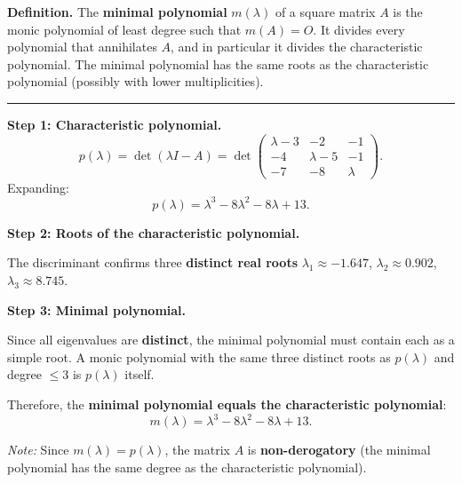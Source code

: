 \documentclass[12pt,a3paper]{article}
\begin{document}
 
\begin{tcolorbox}[enhanced,breakable,
  colback=cE!4,colframe=cE,boxrule=0.8pt,arc=5pt,
  title={\textbf{Answer --- Minimal Polynomial of $A=\begin{pmatrix}3&2&1\\4&5&1\\7&8&0\end{pmatrix}$}},
  fonttitle=\bfseries\color{white},colbacktitle=cE]
 
\textbf{Definition.} The \textbf{minimal polynomial} $m(\lambda)$ of a square matrix $A$
is the monic polynomial of least degree such that $m(A) = O$.
It divides every polynomial that annihilates $A$, and in particular it divides
the characteristic polynomial.  The minimal polynomial has the same roots as
the characteristic polynomial (possibly with lower multiplicities).
 
\medskip\textcolor{cE}{\rule{\textwidth}{0.4pt}}
 
\textbf{Step 1: Characteristic polynomial.}
\[
  p(\lambda) = \det(\lambda I - A)
  = \det\begin{pmatrix}\lambda-3&-2&-1\\-4&\lambda-5&-1\\-7&-8&\lambda\end{pmatrix}.
\]
Expanding:
\[
  p(\lambda) = \lambda^3 - 8\lambda^2 - 8\lambda + 13.
\]
 
\textbf{Step 2: Roots of the characteristic polynomial.}
 
The discriminant confirms three \textbf{distinct real roots}
$\lambda_1 \approx -1.647$,\; $\lambda_2 \approx 0.902$,\; $\lambda_3 \approx 8.745$.
 
\textbf{Step 3: Minimal polynomial.}
 
Since all eigenvalues are \textbf{distinct}, the minimal polynomial must contain
each as a simple root.  A monic polynomial with the same three distinct roots as
$p(\lambda)$ and degree $\leq 3$ is $p(\lambda)$ itself.
 
Therefore, the \textbf{minimal polynomial equals the characteristic polynomial}:
\[
  \boxed{m(\lambda) = \lambda^3 - 8\lambda^2 - 8\lambda + 13.}
\]
 
\textit{Note:} Since $m(\lambda) = p(\lambda)$, the matrix $A$ is
\textbf{non-derogatory} (the minimal polynomial has the same degree as the characteristic polynomial).
 
\end{tcolorbox}
\end{document}
